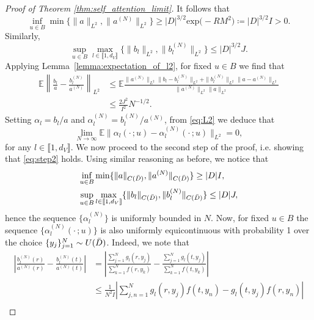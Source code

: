 \documentclass[twoside]{article}
\newcommand{\1}{\mathbbm{1}}
\newcommand{\range}[2]{\llbracket #1, #2 \rrbracket}
\newcommand{\E}{\mathbb{E}}
\begin{document}
\begin{proof}[Proof of Theorem \ref{thm:self_attention_limit}]
It follows that
\[\inf_{u \in B} \min \{ \|a\|_{L^2}, \|a^{(N)}\|_{L^2} \} \geq |D|^{3/2} \text{exp} \big ( - R M^2 \big ) \coloneqq |D|^{3/2} I > 0.\]
Similarly, 
\[\sup_{u \in B} \max_{l \in \range{1}{d_V}} \{ \|b_l\|_{L^2}, \|b_l^{(N)}\|_{L^2} \} \leq |D|^{3/2} J.\]
Applying Lemma~\ref{lemma:expectation_of_l2}, for fixed $u\in B$ we find that
\begin{subequations}
\begin{align}
\label{eq:L2}
\E \left \| \frac{b_l}{a} - \frac{b_l^{(N)}}{a^{(N)}} \right \|_{L^2} &\leq \E \frac{\|a^{(N)}\|_{L^2} \|b_l - b_l^{(N)}\|_{L^2} + \|b_l^{(N)}\|_{L^2} \|a - a^{(N)}\|_{L^2}  }{\|a^{(N)}\|_{L^2} \|a\|_{L^2}} \\
&\leq \frac{2  J^2}{I^2} N^{-1/2}.%
\end{align}
\end{subequations}
Setting \(\alpha_l = b_l/a\) and \(\alpha_l^{(N)} = b_l^{(N)}/a^{(N)}\), from \eqref{eq:L2} we deduce that 
\begin{equation}
    \lim_{N \to \infty} \E \|\alpha_l(\cdot\,;u) - \alpha_l^{(N)}(\cdot\,;u)\|_{L^2} = 0,
\end{equation}
for any $l\in\range{1}{d_V}$. We now proceed to the second step of the proof, i.e. showing that \eqref{eq:step2} holds. Using similar reasoning as before, we notice that 
\begin{subequations}
\begin{align}
\inf_{u \in B}& \min \{ \|a\|_{C(\Bar{D})}, \|a^{(N)}\|_{C(\Bar{D})} \} \geq |D|I,\\
\sup_{u \in B} &\max_{l \in \range{1}{d_V}} \{ \|b_l\|_{C(\Bar{D})}, \|b_l^{(N)}\|_{C(\Bar{D})} \} \leq |D| J,
\end{align}
\end{subequations}
hence the sequence \( \{\alpha_l^{(N)}\}\) is uniformly bounded in $N$. Now, for fixed $u\in B$ the sequence \( \{\alpha_l^{(N)}(\cdot\,;u)\}\) is also uniformly equicontinuous with probability 1 over the choice \(\{y_j\}_{j=1}^N \sim U(\Bar{D})\). Indeed, we note that
    \begin{subequations}
        \begin{align}
            \left| \frac{b_l^{(N)}(r)}{a^{(N)}(r)}- \frac{b_l^{(N)}(t)}{a^{(N)}(t)}\right| &= \left| \frac{\sum_{j=1}^N g_l(r,y_j)}{\sum_{k=1}^N f(r,y_k)} - \frac{\sum_{j=1}^N g_l(t,y_j)}{\sum_{k=1}^N f(t,y_k)}\right|\\
            &\leq\frac{1}{N^2I}\left|\sum_{j,n=1}^Ng_l(r,y_j)f(t,y_n)-g_l(t,y_j)f(r,y_n) \right|\\

\end{align}
\end{subequations}
\end{proof}
\end{document}
